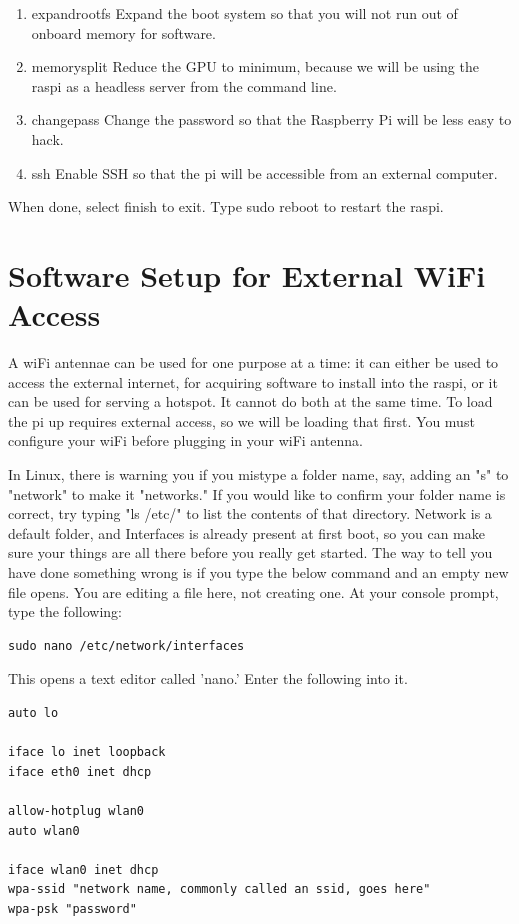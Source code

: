 \begin{enumerate}
\item expandrootfs Expand the boot system so that you will not run out of onboard memory for software.
\item memorysplit Reduce the GPU to minimum, because we will be using the raspi as a headless server from the command line.
\item changepass Change the password so that the Raspberry Pi will be less easy to hack.
\item ssh Enable SSH so that the pi will be accessible from an external computer.
\end{enumerate}

When done, select finish to exit.
Type sudo reboot to restart the raspi.

\section{Software Setup for External WiFi Access}
A wiFi antennae can be used for one purpose at a time: it can either be used to access the external internet, for acquiring software to install into the raspi, or it can be used for serving a hotspot. It cannot do both at the same time. To load the pi up requires external access, so we will be loading that first. You must configure your wiFi before plugging in your wiFi antenna. 

In Linux, there is warning you if you mistype a folder name, say, adding an "s" to "network" to make it "networks." If you would like to confirm your folder name is correct, try typing "ls /etc/" to list the contents of that directory. Network is a default folder, and Interfaces is already present at first boot, so you can make sure your things are all there before you really get started. The way to tell you have done something wrong is if you type the below command and an empty new file opens. You are editing a file here, not creating one.
 At your console prompt, type the following:

\begin{lstlisting}
sudo nano /etc/network/interfaces
\end{lstlisting}

This opens a text editor called 'nano.' Enter the following into it.
\begin{lstlisting}
auto lo

iface lo inet loopback
iface eth0 inet dhcp

allow-hotplug wlan0
auto wlan0

iface wlan0 inet dhcp
wpa-ssid "network name, commonly called an ssid, goes here"
wpa-psk "password"
\end{lstlisting}

